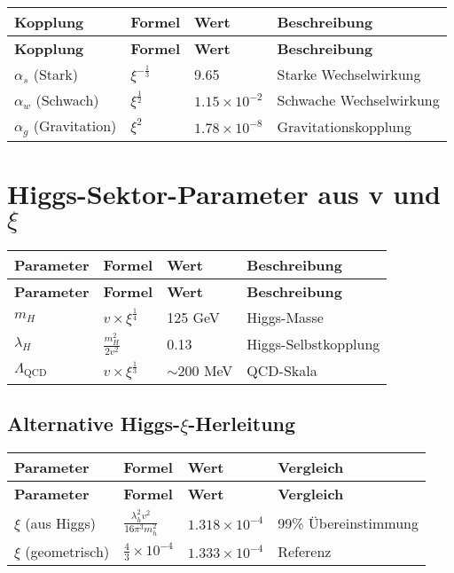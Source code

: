 \documentclass[12pt,a4paper]{article}
\begin{document}
	\begin{longtable}{|p{3cm}|p{3cm}|p{3cm}|p{5cm}|}
		\hline
		\textbf{Kopplung} & \textbf{Formel} & \textbf{Wert} & \textbf{Beschreibung} \\
		\hline
		\endfirsthead
		\hline
		\textbf{Kopplung} & \textbf{Formel} & \textbf{Wert} & \textbf{Beschreibung} \\
		\hline
		\endhead
		\(\alpha_s\) (Stark) & \(\xi^{-\frac{1}{3}}\) & 9.65 & Starke Wechselwirkung \\
		\hline
		\(\alpha_w\) (Schwach) & \(\xi^{\frac{1}{2}}\) & \(1.15 \times 10^{-2}\) & Schwache Wechselwirkung \\
		\hline
		\(\alpha_g\) (Gravitation) & \(\xi^{2}\) & \(1.78 \times 10^{-8}\) & Gravitationskopplung \\
		\hline
	\end{longtable}
	
	\section{Higgs-Sektor-Parameter aus v und \(\xi\)}
	
	\begin{longtable}{|p{3cm}|p{4cm}|p{3cm}|p{4cm}|}
		\hline
		\textbf{Parameter} & \textbf{Formel} & \textbf{Wert} & \textbf{Beschreibung} \\
		\hline
		\endfirsthead
		\hline
		\textbf{Parameter} & \textbf{Formel} & \textbf{Wert} & \textbf{Beschreibung} \\
		\hline
		\endhead
		\(m_H\) & \(v \times \xi^{\frac{1}{4}}\) & 125 GeV & Higgs-Masse \\
		\hline
		\(\lambda_H\) & \(\frac{m_H^{2}}{2v^{2}}\) & 0.13 & Higgs-Selbstkopplung \\
		\hline
		\(\Lambda_{\text{QCD}}\) & \(v \times \xi^{\frac{1}{3}}\) & \(\sim 200\) MeV & QCD-Skala \\
		\hline
	\end{longtable}
	
	\subsection{Alternative Higgs-\(\xi\)-Herleitung}
	
	\begin{longtable}{|p{3cm}|p{5cm}|p{3cm}|p{3cm}|}
		\hline
		\textbf{Parameter} & \textbf{Formel} & \textbf{Wert} & \textbf{Vergleich} \\
		\hline
		\endfirsthead
		\hline
		\textbf{Parameter} & \textbf{Formel} & \textbf{Wert} & \textbf{Vergleich} \\
		\hline
		\endhead
		\(\xi\) (aus Higgs) & \(\frac{\lambda_h^{2}v^{2}}{16\pi^{3}m_h^{2}}\) & \(1.318 \times 10^{-4}\) & 99\% Übereinstimmung \\
		\hline
		\(\xi\) (geometrisch) & \(\frac{4}{3} \times 10^{-4}\) & \(1.333 \times 10^{-4}\) & Referenz \\
		\hline
	\end{longtable}
	
\end{document}
